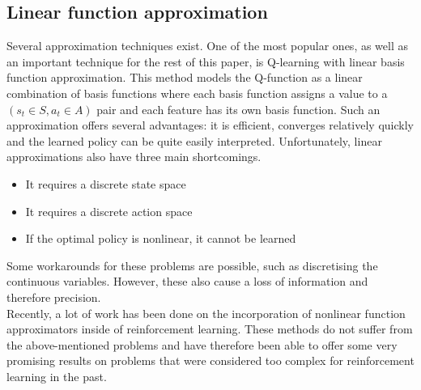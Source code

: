 \subsection{Linear function approximation}
Several approximation techniques exist. One of the most popular ones, as well as an important technique for the rest of this paper,  is Q-learning with linear basis function approximation. This method models the Q-function as a linear combination of basis functions where each basis function assigns a value to a $(s_t \in S,a_t \in A)$ pair and each feature has its own basis function. Such an approximation offers several advantages: it is efficient, converges relatively quickly and the learned policy can be quite easily interpreted. Unfortunately, linear approximations also have three main shortcomings.
\begin{itemize}
    \item It requires a discrete state space
    \item It requires a discrete action space
    \item If the optimal policy is nonlinear, it cannot be learned
\end{itemize}
Some workarounds for these problems are possible, such as discretising the continuous variables. However, these also cause a loss of information and therefore precision.\\
Recently, a lot of work has been done on the incorporation of nonlinear function approximators inside of reinforcement learning. These methods do not suffer from the above-mentioned problems and have therefore been able to offer some very promising results on problems that were considered too complex for reinforcement learning in the past.
